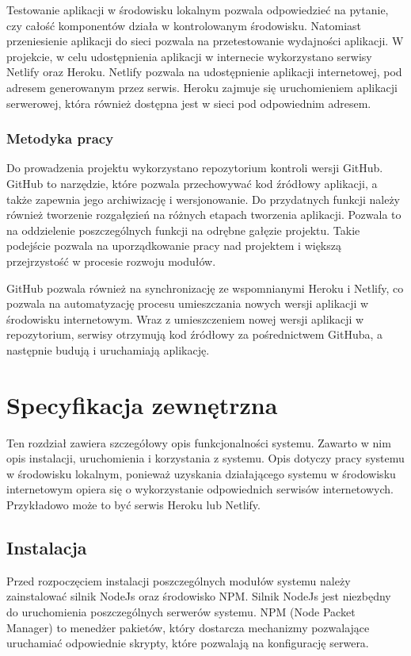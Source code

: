 \documentclass[a4paper,12pt]{book}
\begin{document}
Testowanie aplikacji w środowisku lokalnym pozwala odpowiedzieć na pytanie, czy całość komponentów działa w kontrolowanym środowisku. Natomiast przeniesienie aplikacji do sieci pozwala na przetestowanie wydajności aplikacji. W projekcie, w celu udostępnienia aplikacji w internecie wykorzystano serwisy Netlify oraz Heroku. Netlify pozwala na udostępnienie aplikacji internetowej, pod adresem generowanym przez serwis. Heroku zajmuje się uruchomieniem aplikacji serwerowej, która również dostępna jest w sieci pod odpowiednim adresem.

\subsection{Metodyka pracy}
 
Do prowadzenia projektu wykorzystano repozytorium kontroli wersji GitHub. GitHub to narzędzie, które pozwala przechowywać kod źródłowy aplikacji, a także zapewnia jego archiwizację i wersjonowanie. Do przydatnych funkcji należy również tworzenie rozgałęzień na różnych etapach tworzenia aplikacji. Pozwala to na oddzielenie poszczególnych funkcji na odrębne gałęzie projektu. Takie podejście pozwala na uporządkowanie pracy nad projektem i większą przejrzystość w procesie rozwoju modułów.
 
GitHub pozwala również na synchronizację ze wspomnianymi Heroku i Netlify, co pozwala na automatyzację procesu umieszczania nowych wersji aplikacji w środowisku internetowym. Wraz z umieszczeniem nowej wersji aplikacji w repozytorium, serwisy otrzymują kod źródłowy za pośrednictwem GitHuba, a następnie budują i uruchamiają aplikację.
 

\chapter{Specyfikacja zewnętrzna}
Ten rozdział zawiera szczegółowy opis funkcjonalności systemu. Zawarto w nim opis instalacji, uruchomienia i korzystania z systemu. Opis dotyczy pracy systemu w środowisku lokalnym, ponieważ uzyskania działającego systemu w środowisku internetowym opiera się o wykorzystanie odpowiednich serwisów internetowych. Przykładowo może to być serwis Heroku lub Netlify.

\section{Instalacja}
Przed rozpoczęciem instalacji poszczególnych modułów systemu należy zainstalować silnik NodeJs oraz środowisko NPM. Silnik NodeJs jest niezbędny do uruchomienia poszczególnych serwerów systemu. NPM (Node Packet Manager) to menedżer pakietów, który dostarcza mechanizmy pozwalające uruchamiać odpowiednie skrypty, które pozwalają na konfigurację serwera. 
\end{document}
